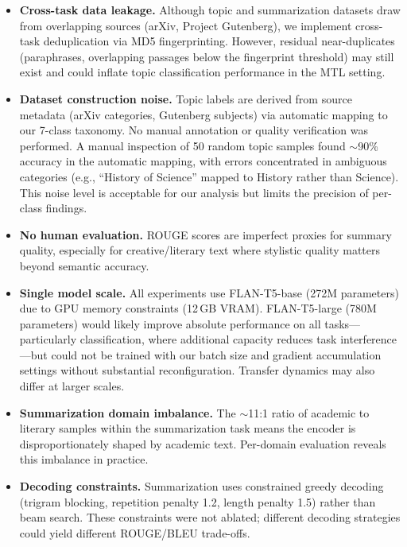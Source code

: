 \documentclass[11pt]{article}
\begin{document}
\begin{itemize}
    \item \textbf{Cross-task data leakage.} Although topic and summarization datasets draw from overlapping sources (arXiv, Project Gutenberg), we implement cross-task deduplication via MD5 fingerprinting. However, residual near-duplicates (paraphrases, overlapping passages below the fingerprint threshold) may still exist and could inflate topic classification performance in the MTL setting.

    \item \textbf{Dataset construction noise.} Topic labels are derived from source metadata (arXiv categories, Gutenberg subjects) via automatic mapping to our 7-class taxonomy. No manual annotation or quality verification was performed. A manual inspection of 50 random topic samples found $\sim$90\% accuracy in the automatic mapping, with errors concentrated in ambiguous categories (e.g., ``History of Science'' mapped to History rather than Science). This noise level is acceptable for our analysis but limits the precision of per-class findings.

    \item \textbf{No human evaluation.} ROUGE scores are imperfect proxies for summary quality, especially for creative/literary text where stylistic quality matters beyond semantic accuracy.

    \item \textbf{Single model scale.} All experiments use FLAN-T5-base (272M parameters) due to GPU memory constraints (12\,GB VRAM). FLAN-T5-large (780M parameters) would likely improve absolute performance on all tasks---particularly classification, where additional capacity reduces task interference---but could not be trained with our batch size and gradient accumulation settings without substantial reconfiguration. Transfer dynamics may also differ at larger scales.

    \item \textbf{Summarization domain imbalance.} The $\sim$11:1 ratio of academic to literary samples within the summarization task means the encoder is disproportionately shaped by academic text. Per-domain evaluation reveals this imbalance in practice.

    \item \textbf{Decoding constraints.} Summarization uses constrained greedy decoding (trigram blocking, repetition penalty 1.2, length penalty 1.5) rather than beam search. These constraints were not ablated; different decoding strategies could yield different ROUGE/BLEU trade-offs.
\end{itemize}
\end{document}
